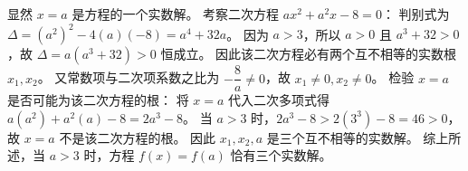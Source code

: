 \begin{answer}
显然 $x = a$ 是方程的一个实数解。
考察二次方程 $ax^2 + a^2 x - 8 = 0$：
判别式为 $\Delta = (a^2)^2 - 4(a)(-8) = a^4 + 32a$。
因为 $a > 3$，所以 $a > 0$ 且 $a^3 + 32 > 0$，故 $\Delta = a(a^3 + 32) > 0$ 恒成立。
因此该二次方程必有两个互不相等的实数根 $x_1, x_2$。
又常数项与二次项系数之比为 $-\dfrac{8}{a} \ne 0$，故 $x_1 \ne 0, x_2 \ne 0$。
检验 $x = a$ 是否可能为该二次方程的根：
将 $x = a$ 代入二次多项式得 $a(a^2) + a^2(a) - 8 = 2a^3 - 8$。
当 $a > 3$ 时，$2a^3 - 8 > 2(3^3) - 8 = 46 > 0$，故 $x = a$ 不是该二次方程的根。
因此 $x_1, x_2, a$ 是三个互不相等的实数解。
综上所述，当 $a > 3$ 时，方程 $f(x) = f(a)$ 恰有三个实数解。



\end{answer}
